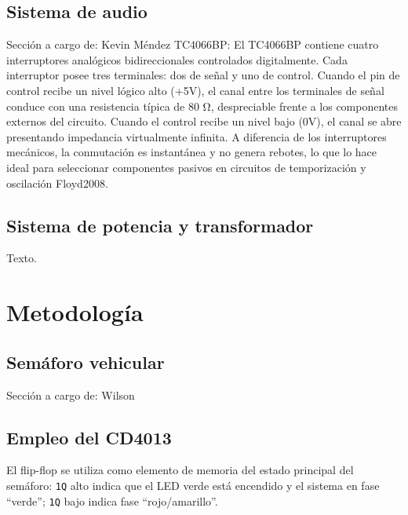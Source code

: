 \documentclass[journal]{IEEEtran}
\begin{document}
\subsection{Sistema de audio}
Sección a cargo de: Kevin Méndez
TC4066BP:
El TC4066BP contiene cuatro interruptores analógicos bidireccionales controlados digitalmente. Cada interruptor posee tres terminales: dos de señal y uno de control. Cuando el pin de control recibe un nivel lógico alto (+5V), el canal entre los terminales de señal conduce con una resistencia típica de 80 Ω, despreciable frente a los componentes externos del circuito. Cuando el control recibe un nivel bajo (0V), el canal se abre presentando impedancia virtualmente infinita.
A diferencia de los interruptores mecánicos, la conmutación es instantánea y no genera rebotes, lo que lo hace ideal para seleccionar componentes pasivos en circuitos de temporización y oscilación Floyd2008.

\subsection{Sistema de potencia y transformador}
Texto.

\section{Metodología}

\subsection{Semáforo vehicular}
Sección a cargo de: Wilson
\subsection{Empleo del CD4013}

El flip-flop se utiliza como elemento de memoria del estado principal del semáforo: \texttt{1Q} alto indica que el LED verde está encendido y el sistema en fase ``verde''; \texttt{1Q} bajo indica fase ``rojo/amarillo''. 
\end{document}
